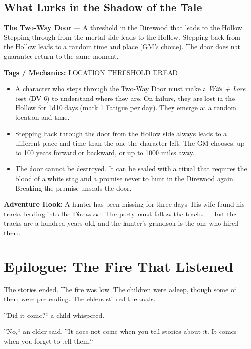 \documentclass[10pt,twoside]{book}
\newcommand{\tag}[1]{\textsc{#1}}
\begin{document}
\section*{What Lurks in the Shadow of the Tale}
\begin{infobox}
\textbf{The Two-Way Door} --- A threshold in the Direwood that leads to the Hollow. Stepping through from the mortal side leads to the Hollow. Stepping back from the Hollow leads to a random time and place (GM's choice). The door does not guarantee return to the same moment.

\textbf{Tags / Mechanics:} \tag{LOCATION} \tag{THRESHOLD} \tag{DREAD}

\begin{itemize}
\item A character who steps through the Two-Way Door must make a \textit{Wits + Lore} test (DV 6) to understand where they are. On failure, they are lost in the Hollow for 1d10 days (mark 1 Fatigue per day). They emerge at a random location and time.
\item Stepping back through the door from the Hollow side always leads to a different place and time than the one the character left. The GM chooses: up to 100 years forward or backward, or up to 1000 miles away.
\item The door cannot be destroyed. It can be sealed with a ritual that requires the blood of a white stag and a promise never to hunt in the Direwood again. Breaking the promise unseals the door.
\end{itemize}

\textbf{Adventure Hook:} A hunter has been missing for three days. His wife found his tracks leading into the Direwood. The party must follow the tracks --- but the tracks are a hundred years old, and the hunter's grandson is the one who hired them.
\end{infobox}

\chapter*{Epilogue: The Fire That Listened}

The stories ended. The fire was low. The children were asleep, though some of them were pretending. The elders stirred the coals.

''Did it come?`` a child whispered.

''No,`` an elder said. ''It does not come when you tell stories about it. It comes when you forget to tell them.``
\end{document}
